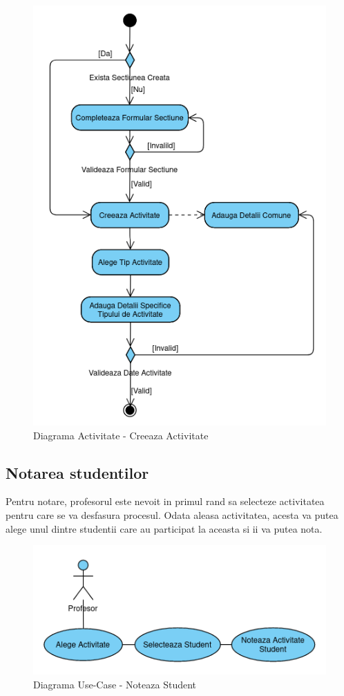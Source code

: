 \documentclass[12pt, a4paper, oneside, romanian]{teza-upb}
\begin{document}
\begin{figure}[H]
\centering
\includegraphics*[width=0.65\columnwidth]{diagrama-activitate-creeaza-activitate}
\caption{Diagrama Activitate - Creeaza Activitate}
\label{diagrama-activitate-creeaza-activitate}
\end{figure}

\subsection{Notarea studentilor}

Pentru notare, profesorul este nevoit in primul rand sa selecteze activitatea pentru care se va desfasura procesul. Odata aleasa activitatea, acesta va putea alege unul dintre studentii care au participat la aceasta si ii va putea nota.

\begin{figure}[H]
\centering
\includegraphics*[width=0.65\columnwidth]{diagrama-use-case-noteaza-student}
\caption{Diagrama Use-Case - Noteaza Student}
\label{diagrama-use-case-noteaza-student}
\end{figure}
\end{document}
